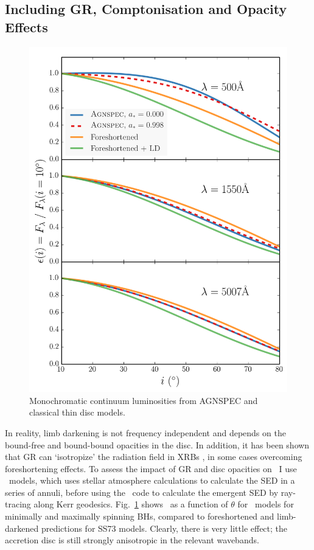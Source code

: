 \subsection{Including GR, Comptonisation and Opacity Effects}

\begin{figure}
\centering
\includegraphics[width=1.0\textwidth]{figures/ewpaper/agnspec.png}
\caption
{
Monochromatic continuum luminosities from AGNSPEC and classical thin disc
models.
}
\label{fig:agnspec_disc}
\end{figure} 


\noindent
In reality, limb darkening is not frequency independent and 
depends on the bound-free and bound-bound opacities in the disc.
In addition, it has been shown that GR can `isotropize' the radiation
field in XRBs \citep{zhang1997,munozdarias2013}, in some cases overcoming
foreshortening effects. To assess the impact of GR and disc opacities
on \ept\ I use \agn\ models, which uses stellar atmosphere 
calculations to calculate the 
SED in a series of annuli, before using the \kerrtrans\ code 
to calculate the emergent SED by ray-tracing along Kerr geodesics.
Fig.~\ref{fig:agnspec_disc} shows \ept\ as a function of 
$\theta$ for \agn\ models for minimally and maximally spinning BHs,
compared to foreshortened and limb-darkened predictions for SS73 models.
Clearly, there is very little effect; 
the accretion disc is still strongly anisotropic in the relevant wavebands.

